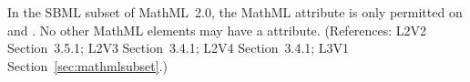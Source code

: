 In the SBML subset of MathML~2.0, the MathML attribute
 is only permitted on 
and .  No other
MathML elements may have a  attribute.  (References:
L2V2 Section~3.5.1; L2V3 Section~3.4.1; 
L2V4 Section~3.4.1; L3V1 Section~\ref{sec:mathmlsubset}.)

